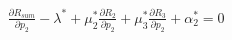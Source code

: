 \documentclass[preview]{standalone}
\begin{document}
\begin{align*}
\frac{\partial {R_{sum}}}{\partial {p_2}} - \lambda^\ast + \mu_2^\ast \frac{\partial {R_2}}{\partial {p_2}} + \mu_3^\ast \frac{\partial {R_3}}{\partial {p_2}} + \alpha_2^\ast = 0
\end{align*}
\end{document}

